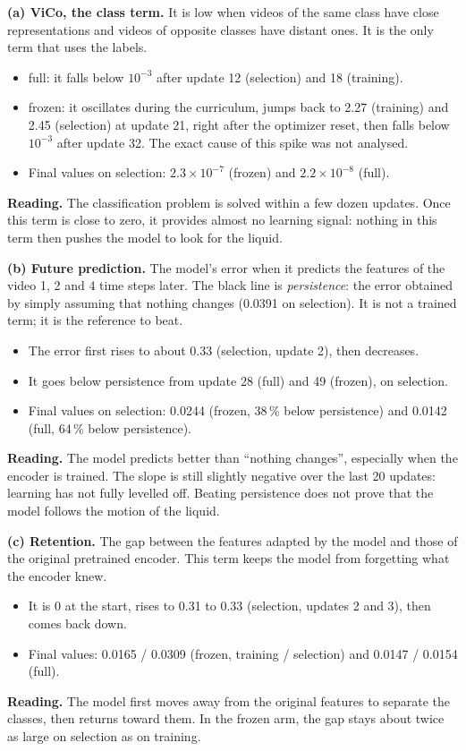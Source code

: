 \documentclass[11pt,a4paper]{article}
\newcommand{\reading}[1]{\textbf{Reading.} #1}
\begin{document}
\textbf{(a) ViCo, the class term.} It is low when videos of the same class have close
representations and videos of opposite classes have distant ones. It is the only term that uses
the labels.
\begin{itemize}\itemsep1pt
\item \textcolor{full}{full}: it falls below $10^{-3}$ after update 12 (selection) and 18 (training).
\item \textcolor{frozen}{frozen}: it oscillates during the curriculum, jumps back to 2.27 (training) and 2.45
      (selection) at update 21, right after the optimizer reset, then falls below
      $10^{-3}$ after update 32. The exact cause of this spike was not analysed.
\item Final values on selection: $2.3\times10^{-7}$ (frozen) and $2.2\times10^{-8}$ (full).
\end{itemize}
\reading{The classification problem is solved within a few dozen updates. Once this term is
close to zero, it provides almost no learning signal: nothing in this term then pushes the model
to look for the liquid.}

\textbf{(b) Future prediction.} The model's error when it predicts the features of the video
1, 2 and 4 time steps later. The black line is \emph{persistence}: the error obtained by simply
assuming that nothing changes (0.0391 on selection). It is not a trained term; it is the
reference to beat.
\begin{itemize}\itemsep1pt
\item The error first rises to about 0.33 (selection, update 2), then decreases.
\item It goes below persistence from update 28 (full) and 49 (frozen), on selection.
\item Final values on selection: 0.0244 (frozen, 38\,\% below persistence) and 0.0142
      (full, 64\,\% below persistence).
\end{itemize}
\reading{The model predicts better than ``nothing changes'', especially when the encoder is
trained. The slope is still slightly negative over the last 20 updates: learning has not fully
levelled off. Beating persistence does not prove that the model follows the motion of the liquid.}

\textbf{(c) Retention.} The gap between the features adapted by the model and those of the
original pretrained encoder. This term keeps the model from forgetting what the encoder knew.
\begin{itemize}\itemsep1pt
\item It is 0 at the start, rises to 0.31 to 0.33 (selection, updates 2 and 3), then comes back down.
\item Final values: 0.0165 / 0.0309 (frozen, training / selection) and 0.0147 / 0.0154 (full).
\end{itemize}
\reading{The model first moves away from the original features to separate the classes, then
returns toward them. In the frozen arm, the gap stays about twice as large on selection as on
training.}
\end{document}

